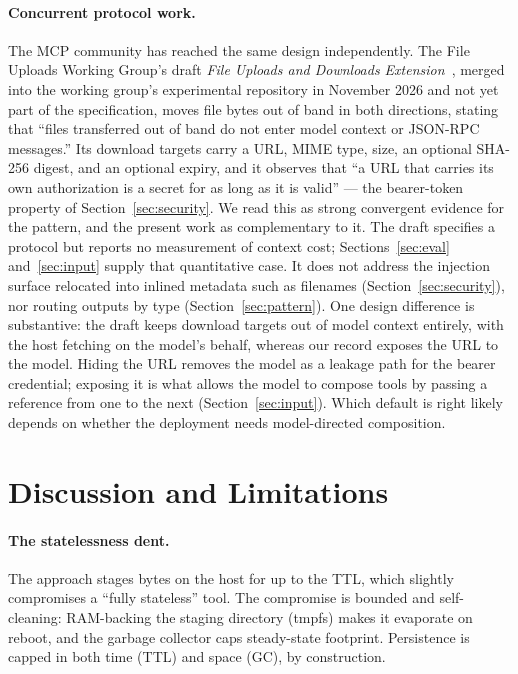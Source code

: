 \documentclass[11pt]{article}
\begin{document}
\paragraph{Concurrent protocol work.} The MCP community has reached the same design independently. The File Uploads Working Group's draft \emph{File Uploads and Downloads Extension}~\citep{mcpfiles}, merged into the working group's experimental repository in November 2026 and not yet part of the specification, moves file bytes out of band in both directions, stating that ``files transferred out of band do not enter model context or JSON-RPC messages.'' Its download targets carry a URL, MIME type, size, an optional SHA-256 digest, and an optional expiry, and it observes that ``a URL that carries its own authorization is a secret for as long as it is valid'' --- the bearer-token property of Section~\ref{sec:security}. We read this as strong convergent evidence for the pattern, and the present work as complementary to it. The draft specifies a protocol but reports no measurement of context cost; Sections~\ref{sec:eval} and~\ref{sec:input} supply that quantitative case. It does not address the injection surface relocated into inlined metadata such as filenames (Section~\ref{sec:security}), nor routing outputs by type (Section~\ref{sec:pattern}). One design difference is substantive: the draft keeps download targets out of model context entirely, with the host fetching on the model's behalf, whereas our record exposes the URL to the model. Hiding the URL removes the model as a leakage path for the bearer credential; exposing it is what allows the model to compose tools by passing a reference from one to the next (Section~\ref{sec:input}). Which default is right likely depends on whether the deployment needs model-directed composition.

\section{Discussion and Limitations}\label{sec:discussion}

\paragraph{The statelessness dent.} The approach stages bytes on the host for up to the TTL, which slightly compromises a ``fully stateless'' tool. The compromise is bounded and self-cleaning: RAM-backing the staging directory (tmpfs) makes it evaporate on reboot, and the garbage collector caps steady-state footprint. Persistence is capped in both time (TTL) and space (GC), by construction.
\end{document}

